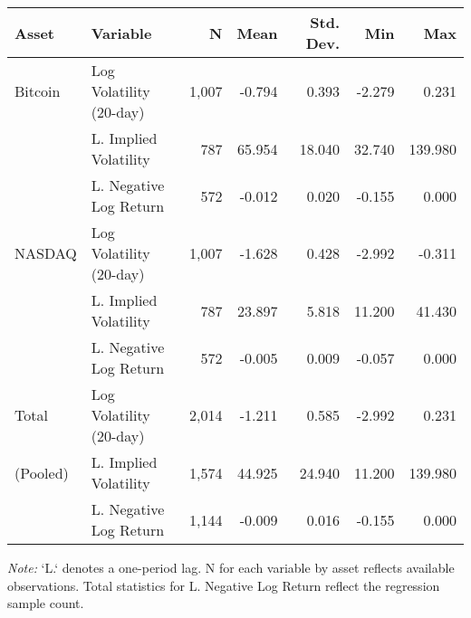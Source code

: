 
\begin{threeparttable}
    \footnotesize %

    \begin{tabular}{ll r r r r r}
    \toprule
    Asset   & Variable                  & N       & Mean    & Std. Dev. & Min     & Max     \\
    \midrule
    Bitcoin & Log Volatility (20-day) & 1,007   & -0.794  & 0.393     & -2.279  & 0.231   \\
            & L. Implied Volatility     &   787   & 65.954  & 18.040    & 32.740  & 139.980 \\
            & L. Negative Log Return    &   572   & -0.012  & 0.020     & -0.155  & 0.000   \\
    \addlinespace
    NASDAQ  & Log Volatility (20-day) & 1,007   & -1.628  & 0.428     & -2.992  & -0.311  \\
            & L. Implied Volatility     &   787   & 23.897  & 5.818     & 11.200  & 41.430  \\
            & L. Negative Log Return    &   572   & -0.005  & 0.009     & -0.057  & 0.000   \\
    \midrule
    Total   & Log Volatility (20-day) & 2,014   & -1.211  & 0.585     & -2.992  & 0.231   \\
    (Pooled)& L. Implied Volatility     & 1,574   & 44.925  & 24.940    & 11.200  & 139.980 \\
            & L. Negative Log Return    & 1,144   & -0.009  & 0.016     & -0.155  & 0.000   \\
    \bottomrule
    \end{tabular}

    \begin{tablenotes}
        \item \textit{Note:} `L.` denotes a one-period lag. N for each variable by asset reflects available observations. Total statistics for L. Negative Log Return reflect the regression sample count.
    \end{tablenotes}
\end{threeparttable}

